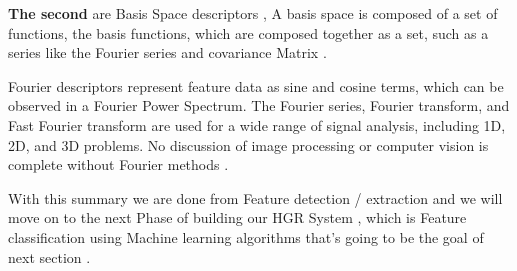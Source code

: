 \textbf{The second } are Basis Space descriptors   , A basis space is composed of a set of functions, the basis functions, which are
composed together as a set, such as a series like the Fourier series and covariance Matrix  . 

Fourier descriptors represent feature data as sine and cosine terms, which can be
observed in a Fourier Power Spectrum. The Fourier series, Fourier transform, and Fast
Fourier transform are used for a wide range of signal analysis, including 1D, 2D, and 3D
problems. No discussion of image processing or computer vision is complete without
Fourier methods .

With this summary we are done from Feature detection / extraction and we will move on to the next Phase of building  our HGR System , which is  Feature classification using Machine learning algorithms that's going to be the goal of next section .